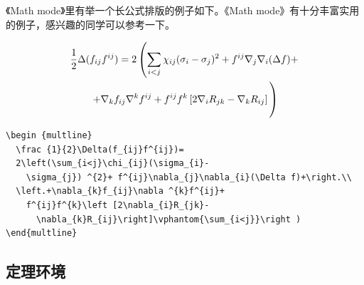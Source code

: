 《Math mode》里有举一个长公式排版的例子如下。《Math mode》有十分丰富实用的例子，感兴趣的同学可以参考一下。

\begin {multline}
  \frac {1}{2}\Delta (f_{ij}f^{ij})=
  2\left (\sum _{i<j}\chi _{ij}(\sigma _{i}-
    \sigma _{j}) ^{2}+ f^{ij}\nabla _{j}\nabla _{i}(\Delta f)+\right .\\
  \left .+\nabla _{k}f_{ij}\nabla ^{k}f^{ij}+
    f^{ij}f^{k}\left [2\nabla _{i}R_{jk}-
      \nabla _{k}R_{ij}\right ]\vphantom {\sum _{i<j}}\right )
\end{multline}

\begin{lstlisting}[language={[LaTeX]TeX}, caption={长公式排版}]
\begin {multline}
  \frac {1}{2}\Delta(f_{ij}f^{ij})=
  2\left(\sum_{i<j}\chi_{ij}(\sigma_{i}-
    \sigma_{j}) ^{2}+ f^{ij}\nabla_{j}\nabla_{i}(\Delta f)+\right.\\
  \left.+\nabla_{k}f_{ij}\nabla ^{k}f^{ij}+
    f^{ij}f^{k}\left [2\nabla_{i}R_{jk}-
      \nabla_{k}R_{ij}\right]\vphantom{\sum_{i<j}}\right )
\end{multline}
\end{lstlisting}

\subsection{定理环境}

